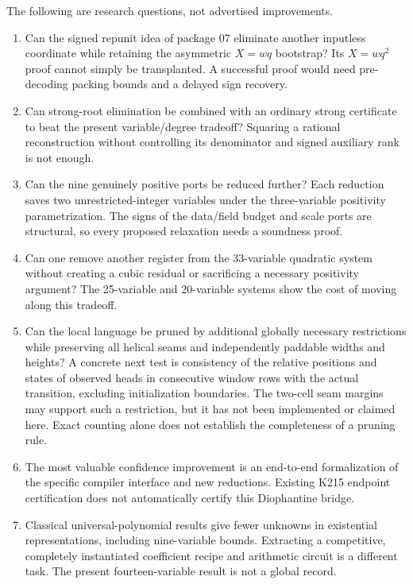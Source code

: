\documentclass[11pt]{article}
\begin{document}
The following are research questions, not advertised improvements.
\begin{enumerate}
\item Can the signed repunit idea of package 07 eliminate another inputless coordinate while retaining the asymmetric $X=wq$ bootstrap? Its $X=wq^2$ proof cannot simply be transplanted. A successful proof would need pre-decoding packing bounds and a delayed sign recovery.
\item Can strong-root elimination be combined with an ordinary strong certificate to beat the present variable/degree tradeoff? Squaring a rational reconstruction without controlling its denominator and signed auxiliary rank is not enough.
\item Can the nine genuinely positive ports be reduced further? Each reduction saves two unrestricted-integer variables under the three-variable positivity parametrization. The signs of the data/field budget and scale ports are structural, so every proposed relaxation needs a soundness proof.
\item Can one remove another register from the 33-variable quadratic system without creating a cubic residual or sacrificing a necessary positivity argument? The 25-variable and 20-variable systems show the cost of moving along this tradeoff.
\item Can the local language be pruned by additional globally necessary restrictions while preserving all helical seams and independently paddable widths and heights? A concrete next test is consistency of the relative positions and states of observed heads in consecutive window rows with the actual transition, excluding initialization boundaries. The two-cell seam margins may support such a restriction, but it has not been implemented or claimed here. Exact counting alone does not establish the completeness of a pruning rule.
\item The most valuable confidence improvement is an end-to-end formalization of the specific compiler interface and new reductions. Existing K215 endpoint certification does not automatically certify this Diophantine bridge.
\item Classical universal-polynomial results give fewer unknowns in existential representations, including nine-variable bounds. Extracting a competitive, completely instantiated coefficient recipe and arithmetic circuit is a different task. The present fourteen-variable result is not a global record.
\end{enumerate}
\end{document}
